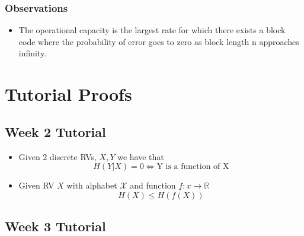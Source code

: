 \documentclass{article}
\begin{document}
\subsubsection{Observations}
\begin{itemize}
    \item The operational capacity is the largest rate for which there exists a block code where the probability of error goes to zero as block length n approaches infinity.
\end{itemize}

\section{Tutorial Proofs}
\subsection{Week 2 Tutorial}
\begin{itemize}
    \item Given 2 discrete RVs, \(X, Y\) we have that
    \[H(Y|X) = 0 \Longleftrightarrow \text{Y is a function of X}\]
    \item Given RV \(X\) with alphabet \(\mathcal{X}\) and function \(f: x \to \mathbb{R}\)
    \[H(X) \leq H(f(X))\]
\end{itemize}
\subsection{Week 3 Tutorial}

\end{document}
